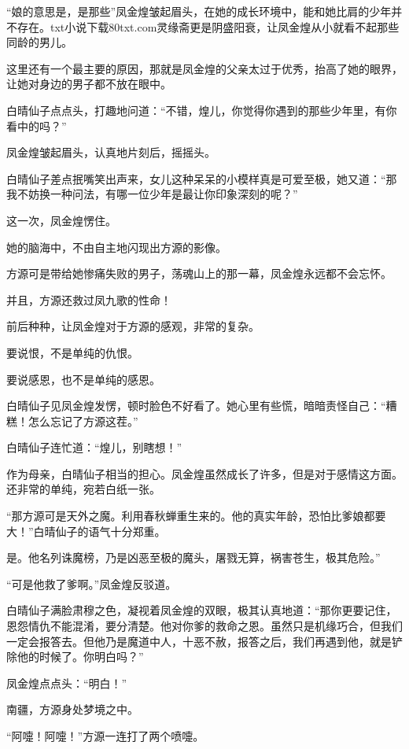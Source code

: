 
\begin{this_body}

“娘的意思是，是那些”凤金煌皱起眉头，在她的成长环境中，能和她比肩的少年并不存在。txt小说下载80txt.com灵缘斋更是阴盛阳衰，让凤金煌从小就看不起那些同龄的男儿。

这里还有一个最主要的原因，那就是凤金煌的父亲太过于优秀，抬高了她的眼界，让她对身边的男子都不放在眼中。

白晴仙子点点头，打趣地问道：“不错，煌儿，你觉得你遇到的那些少年里，有你看中的吗？”

凤金煌皱起眉头，认真地片刻后，摇摇头。

白晴仙子差点抿嘴笑出声来，女儿这种呆呆的小模样真是可爱至极，她又道：“那我不妨换一种问法，有哪一位少年是最让你印象深刻的呢？”

这一次，凤金煌愣住。

她的脑海中，不由自主地闪现出方源的影像。

方源可是带给她惨痛失败的男子，荡魂山上的那一幕，凤金煌永远都不会忘怀。

并且，方源还救过凤九歌的性命！

前后种种，让凤金煌对于方源的感观，非常的复杂。

要说恨，不是单纯的仇恨。

要说感恩，也不是单纯的感恩。

白晴仙子见凤金煌发愣，顿时脸色不好看了。她心里有些慌，暗暗责怪自己：“糟糕！怎么忘记了方源这茬。”

白晴仙子连忙道：“煌儿，别瞎想！”

作为母亲，白晴仙子相当的担心。凤金煌虽然成长了许多，但是对于感情这方面。还非常的单纯，宛若白纸一张。

“那方源可是天外之魔。利用春秋蝉重生来的。他的真实年龄，恐怕比爹娘都要大！”白晴仙子的语气十分郑重。

是。他名列诛魔榜，乃是凶恶至极的魔头，屠戮无算，祸害苍生，极其危险。”

“可是他救了爹啊。”凤金煌反驳道。

白晴仙子满脸肃穆之色，凝视着凤金煌的双眼，极其认真地道：“那你更要记住，恩怨情仇不能混淆，要分清楚。他对你爹的救命之恩。虽然只是机缘巧合，但我们一定会报答去。但他乃是魔道中人，十恶不赦，报答之后，我们再遇到他，就是铲除他的时候了。你明白吗？”

凤金煌点点头：“明白！”

南疆，方源身处梦境之中。

“阿嚏！阿嚏！”方源一连打了两个喷嚏。


\end{this_body}
